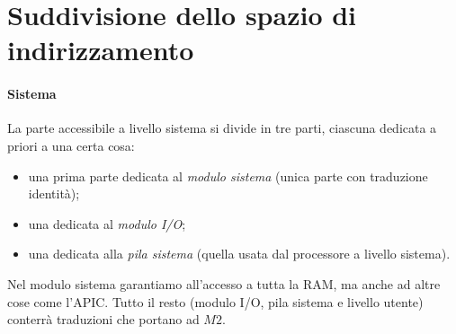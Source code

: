 \clearpage 

\section{Suddivisione dello spazio di indirizzamento}
\paragraph{Sistema} La parte accessibile a livello sistema si divide in tre parti, ciascuna dedicata a priori a una certa cosa:
\begin{itemize}
	\item una prima parte dedicata al \textit{modulo sistema} (unica parte con traduzione identità);
	\item una dedicata al \textit{modulo I/O};
	\item una dedicata alla \textit{pila sistema} (quella usata dal processore a livello sistema).
\end{itemize}
Nel modulo sistema garantiamo all'accesso a tutta la RAM, ma anche ad altre cose come l'APIC. Tutto il resto (modulo I/O, pila sistema e livello utente) conterrà traduzioni che portano ad $M2$.
